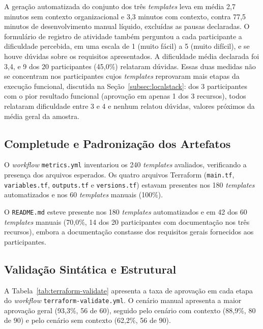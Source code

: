A geração automatizada do conjunto dos três \textit{templates} leva em média 2,7 minutos sem contexto organizacional e 3,3 minutos com contexto, contra 77,5 minutos de desenvolvimento manual líquido, excluídas as pausas declaradas. O formulário de registro de atividade também perguntou a cada participante a dificuldade percebida, em uma escala de 1 (muito fácil) a 5 (muito difícil), e se houve dúvidas sobre os requisitos apresentados. A dificuldade média declarada foi 3,4, e 9 dos 20 participantes (45,0\%) relataram dúvidas. Essas duas medidas não se concentram nos participantes cujos \textit{templates} reprovaram mais etapas da execução funcional, discutida na Seção~\ref{subsec:localstack}: dos 3 participantes com o pior resultado funcional (aprovação em apenas 1 dos 3 recursos), todos relataram dificuldade entre 3 e 4 e nenhum relatou dúvidas, valores próximos da média geral da amostra.

\subsection{Completude e Padronização dos Artefatos}

O \textit{workflow} \texttt{metrics.yml} inventariou os 240 \textit{templates} avaliados, verificando a presença dos arquivos esperados. Os quatro arquivos Terraform (\texttt{main.tf}, \texttt{variables.tf}, \texttt{outputs.tf} e \texttt{versions.tf}) estavam presentes nos 180 \textit{templates} automatizados e nos 60 \textit{templates} manuais (100\%).

O \texttt{README.md} esteve presente nos 180 \textit{templates} automatizados e em 42 dos 60 \textit{templates} manuais (70,0\%, 14 dos 20 participantes com documentação nos três recursos), embora a documentação constasse dos requisitos gerais fornecidos aos participantes. 

\subsection{Validação Sintática e Estrutural}

A Tabela~\ref{tab:terraform-validate} apresenta a taxa de aprovação em cada etapa do \textit{workflow} \texttt{terraform-validate.yml}. O cenário manual apresenta a maior aprovação geral (93,3\%, 56 de 60), seguido pelo cenário com contexto (88,9\%, 80 de 90) e pelo cenário sem contexto (62,2\%, 56 de 90).

